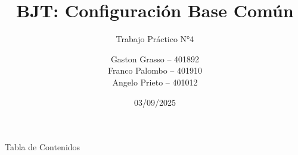 \documentclass[]{beamer}
\title[BJT Base Común]{BJT: Configuración Base Común}
\subtitle{Trabajo Práctico N°4}
\author[Grasso, Palombo, Prieto]{%
  \begin{tabular}{l}
    Gaston Grasso -- 401892 \\
    Franco Palombo -- 401910 \\
    Angelo Prieto -- 401012
  \end{tabular}
}
\institute[UTN - FRC]{Universidad Tecnológica Nacional, Facultad Regional Córdoba}
\date[2025]{03/09/2025}
\begin{document}
\frame{\titlepage}

\begin{frame}{Tabla de Contenidos}
  \tableofcontents[hideothersubsections]
\end{frame}






\end{document}
